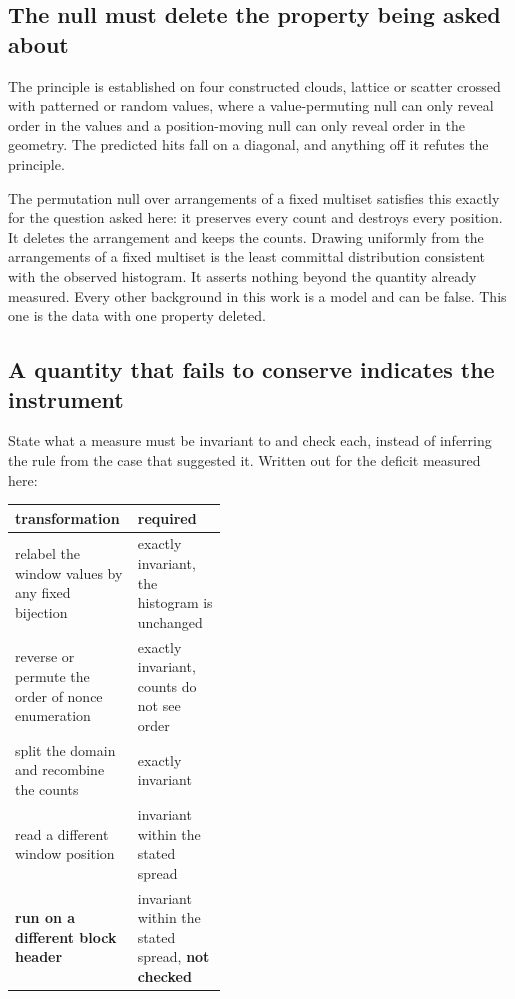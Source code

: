 \subsection{The null must delete the property being asked about}

The principle is established on four constructed clouds, lattice or scatter crossed with patterned or random values, where a value-permuting null can only reveal order in the values and a position-moving null can only reveal order in the geometry. The predicted hits fall on a diagonal, and anything off it refutes the principle.

The permutation null over arrangements of a fixed multiset satisfies this exactly for the question asked here: it preserves every count and destroys every position. It deletes the arrangement and keeps the counts. Drawing uniformly from the arrangements of a fixed multiset is the least committal distribution consistent with the observed histogram. It asserts nothing beyond the quantity already measured. Every other background in this work is a model and can be false. This one is the data with one property deleted.

\subsection{A quantity that fails to conserve indicates the instrument}

State what a measure must be invariant to and check each, instead of inferring the rule from the case that suggested it. Written out for the deficit measured here:

\begin{center}
\begin{tabular}{@{}lp{0.42\linewidth}@{}}
\toprule
transformation & required \\
\midrule
relabel the window values by any fixed bijection & exactly invariant, the histogram is unchanged \\
reverse or permute the order of nonce enumeration & exactly invariant, counts do not see order \\
split the domain and recombine the counts & exactly invariant \\
read a different window position & invariant within the stated spread \\
\textbf{run on a different block header} & invariant within the stated spread, \textbf{not checked} \\
\bottomrule
\end{tabular}
\end{center}

